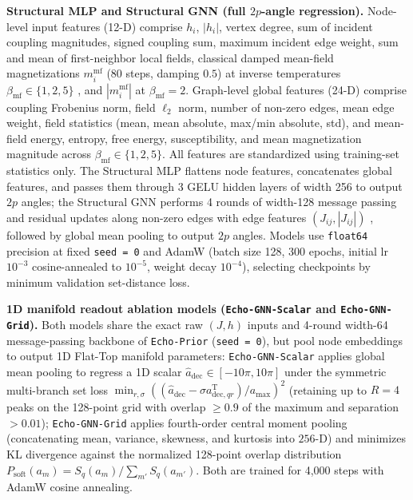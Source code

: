 \documentclass{article}
\theoremstyle{plain}
\theoremstyle{definition}
\begin{document}
\textbf{Structural MLP and Structural GNN (full $2p$-angle regression).} Node-level input features (12-D) comprise $h_i$, $|h_i|$, vertex degree, sum of incident coupling magnitudes, signed coupling sum, maximum incident edge weight, sum and mean of first-neighbor local fields, classical damped mean-field magnetizations $m_i^{\mathrm{mf}}$ (80 steps, damping $0.5$) at inverse temperatures $\beta_{\mathrm{mf}}\in\{1,2,5\}$ \citep{wainwright2008graphical}, and $|m_i^{\mathrm{mf}}|$ at $\beta_{\mathrm{mf}}=2$. Graph-level global features (24-D) comprise coupling Frobenius norm, field $\ell_2$ norm, number of non-zero edges, mean edge weight, field statistics (mean, mean absolute, max/min absolute, std), and mean-field energy, entropy, free energy, susceptibility, and mean magnetization magnitude across $\beta_{\mathrm{mf}}\in\{1,2,5\}$. All features are standardized using training-set statistics only. The Structural MLP flattens node features, concatenates global features, and passes them through 3 GELU hidden layers of width 256 to output $2p$ angles; the Structural GNN performs 4 rounds of width-128 message passing and residual updates along non-zero edges with edge features $(J_{ij}, |J_{ij}|)$ \citep{gilmer2017neural,xu2019how}, followed by global mean pooling to output $2p$ angles. Models use \texttt{float64} precision at fixed \texttt{seed = 0} and AdamW \citep{loshchilov2019decoupled} (batch size 128, 300 epochs, initial lr $10^{-3}$ cosine-annealed to $10^{-5}$, weight decay $10^{-4}$), selecting checkpoints by minimum validation set-distance loss.

\textbf{1D manifold readout ablation models (\texttt{Echo-GNN-Scalar} and \texttt{Echo-GNN-Grid}).} Both models share the exact raw $(J,h)$ inputs and 4-round width-64 message-passing backbone of \texttt{Echo-Prior} (\texttt{seed = 0}), but pool node embeddings to output 1D Flat-Top manifold parameters: \texttt{Echo-GNN-Scalar} applies global mean pooling to regress a 1D scalar $\widehat a_{\mathrm{dec}}\in[-10\pi,10\pi]$ under the symmetric multi-branch set loss $\min_{r,\sigma}((\widehat a_{\mathrm{dec}}-\sigma a_{\mathrm{dec},qr}^{\mathrm T})/a_{\max})^2$ (retaining up to $R=4$ peaks on the 128-point grid with overlap $\ge 0.9$ of the maximum and separation $>0.01$); \texttt{Echo-GNN-Grid} applies fourth-order central moment pooling (concatenating mean, variance, skewness, and kurtosis into $256$-D) and minimizes KL divergence against the normalized 128-point overlap distribution $P_{\mathrm{soft}}(a_m)=S_q(a_m)/\sum_{m'}S_q(a_{m'})$. Both are trained for 4,000 steps with AdamW cosine annealing.
\end{document}
